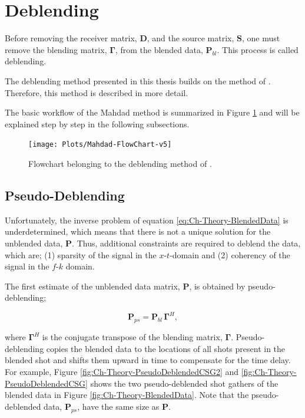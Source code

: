 \section{Deblending} \label{sec:MahdadMethod}

Before removing the receiver matrix, $\mathbf{D}$, and the source matrix, $\mathbf{S}$, one must remove  the blending matrix, $\mathbf{\Gamma}$, from the blended data, $\mathbf{P}_{bl}$. This process is called deblending.

The deblending method presented in this thesis builds on the method of \citet{Mahdad-Deblending-Method}. Therefore, this method is described in more detail.

The basic workflow of the Mahdad method is summarized in Figure \ref{fig:Ch-Theory-FlowChart} and will be explained step by step in the following subsections. 

\begin{figure}
	\centering
	\texttt{[image: Plots/Mahdad-FlowChart-v5]}
	\caption{Flowchart belonging to the deblending method of \citet{Mahdad-Deblending-Method}.}
	\label{fig:Ch-Theory-FlowChart}
\end{figure}

\subsection{Pseudo-Deblending}

Unfortunately, the inverse problem of equation \ref{eq:Ch-Theory-BlendedData} is underdetermined, which means that there is not a unique solution for the unblended data, $\mathbf{P}$. Thus, additional constraints are required to deblend the data, which are; (1) sparsity of the signal in the $x$-$t$-domain and (2) coherency of the signal in the $f$-$k$ domain. 

The first estimate of the unblended data matrix, $\mathbf{P}$, is obtained by pseudo-deblending;

\begin{equation}
	\mathbf{P}_{ps} = \mathbf{P}_{bl} \, \mathbf{\Gamma}^H,
	\label{eq:Ch-Theory-PseudoDeblended}
\end{equation}

where $\mathbf{\Gamma}^H$ is the conjugate transpose of the blending matrix, $\mathbf{\Gamma}$. Pseudo-deblending copies the blended data to the locations of all shots present in the blended shot and shifts them  upward in time to compensate for the time delay. For example, Figure \ref{fig:Ch-Theory-PseudoDeblendedCSG2} and \ref{fig:Ch-Theory-PseudoDeblendedCSG} shows the two pseudo-deblended shot gathers of the blended data in Figure \ref{fig:Ch-Theory-BlendedData}. Note that the pseudo-deblended data, $\mathbf{P}_{ps}$, have the same size as $\mathbf{P}$.


